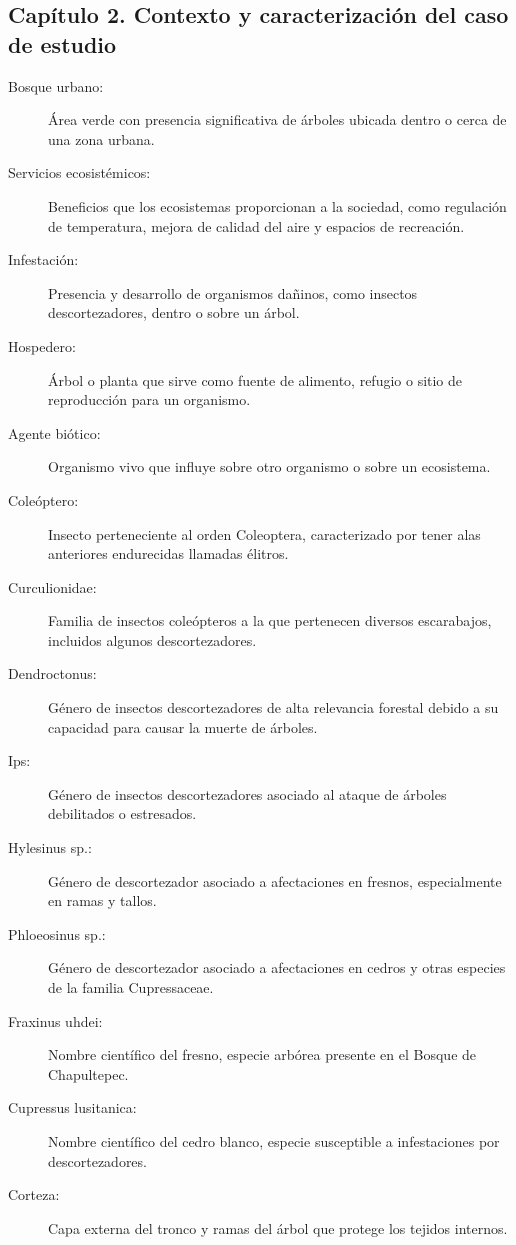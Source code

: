 \subsection*{Capítulo 2. Contexto y caracterización del caso de estudio}
\begin{description}
    \item[Bosque urbano:] Área verde con presencia significativa de árboles ubicada dentro o cerca de una zona urbana.
    \item[Servicios ecosistémicos:] Beneficios que los ecosistemas proporcionan a la sociedad, como regulación de temperatura, mejora de calidad del aire y espacios de recreación.
    \item[Infestación:] Presencia y desarrollo de organismos dañinos, como insectos descortezadores, dentro o sobre un árbol.
    \item[Hospedero:] Árbol o planta que sirve como fuente de alimento, refugio o sitio de reproducción para un organismo.
    \item[Agente biótico:] Organismo vivo que influye sobre otro organismo o sobre un ecosistema.
    \item[Coleóptero:] Insecto perteneciente al orden Coleoptera, caracterizado por tener alas anteriores endurecidas llamadas élitros.
    \item[Curculionidae:] Familia de insectos coleópteros a la que pertenecen diversos escarabajos, incluidos algunos descortezadores.
    \item[Dendroctonus:] Género de insectos descortezadores de alta relevancia forestal debido a su capacidad para causar la muerte de árboles.
    \item[Ips:] Género de insectos descortezadores asociado al ataque de árboles debilitados o estresados.
    \item[Hylesinus sp.:] Género de descortezador asociado a afectaciones en fresnos, especialmente en ramas y tallos.
    \item[Phloeosinus sp.:] Género de descortezador asociado a afectaciones en cedros y otras especies de la familia Cupressaceae.
    \item[Fraxinus uhdei:] Nombre científico del fresno, especie arbórea presente en el Bosque de Chapultepec.
    \item[Cupressus lusitanica:] Nombre científico del cedro blanco, especie susceptible a infestaciones por descortezadores.
    \item[Corteza:] Capa externa del tronco y ramas del árbol que protege los tejidos internos.

\end{description}
